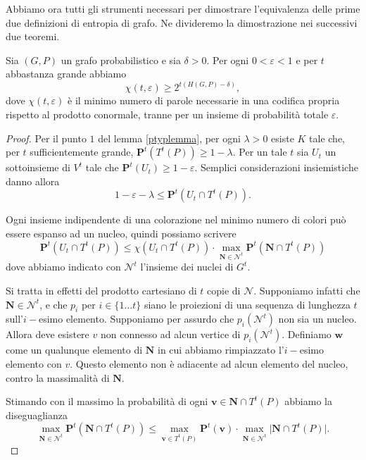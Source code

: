 Abbiamo ora tutti gli strumenti necessari per dimostrare l'equivalenza delle prime due definizioni di entropia di grafo. Ne divideremo la dimostrazione nei successivi due teoremi. 
\begin{theorem}[K\"orner]
	Sia \((G,P)\) un grafo probabilistico e sia \(\delta>0\). Per ogni \(0<\varepsilon<1\) e per \(t\) abbastanza grande abbiamo
	\[\chi(t,\varepsilon)\ge 2^{t(H(G,P)-\delta)},\]
	dove \(\chi(t, \varepsilon)\) è il minimo numero di parole necessarie in una codifica propria rispetto al prodotto conormale, tranne per un insieme di probabilità totale \(\varepsilon\). 
\end{theorem}
\begin{proof}
	Per il punto \(1\) del lemma \ref{ptyplemma}, per ogni \(\lambda>0\) esiste \(K\) tale che, per \(t\) sufficientemente grande, \(\mathbf{P}^t(T^t(P))\ge 1-\lambda\). Per un tale \(t\) sia \(U_{t}\) un sottoinsieme di \(V^t\) tale che \(\mathbf{P}^t(U_{t})\ge 1-\varepsilon\). Semplici considerazioni insiemistiche danno allora 
	\begin{equation}
		\label{eq:epsilonlambda} 1-\varepsilon-\lambda\le \mathbf{P}^t(U_{t}\cap T^t(P)). 
	\end{equation}
	
	Ogni insieme indipendente di una colorazione nel minimo numero di colori può essere espanso ad un nucleo, quindi possiamo scrivere 
	\begin{equation}
		\label{eq:expansion} \mathbf{P}^t(U_{t}\cap T^t(P))\le \chi(U_{t}\cap T^t(P))\cdot\max_{\mathbf{N}\in \mathcal{N}^t} \mathbf{P}^t(\mathbf{N}\cap T^t(P)) 
	\end{equation}
	dove abbiamo indicato con \(\mathcal{N}^t\) l'insieme dei nuclei di \(G^t\).
	
	Si tratta in effetti del prodotto cartesiano di \(t\) copie di \(\mathcal{N}\). Supponiamo infatti che \(\mathbf{N}\in \mathcal{N}^t\), e che \(p_i\) per \(i\in\{1\dots t\}\) siano le proiezioni di una sequenza di lunghezza \(t\) sull'\(i-\)esimo elemento. Supponiamo per assurdo che \(p_i(\mathcal{N}^t)\) non sia un nucleo. Allora deve esistere \(v\) non connesso ad alcun vertice di \(p_i(\mathcal{N}^t)\). Definiamo \(\mathbf{w}\) come un qualunque elemento di \(\mathbf{N}\) in cui abbiamo rimpiazzato l'\(i-\)esimo elemento con \(v\). Questo elemento non è adiacente ad alcun elemento del nucleo, contro la massimalità di \(\mathbf{N}\).
	
	Stimando con il massimo la probabilità di ogni \(\mathbf{v}\in \mathbf{N}\cap T^{t}(P)\) abbiamo la diseguaglianza 
	\begin{equation}
		\label{eq:maxmax} \max_{\mathbf{N}\in \mathcal{N}^t} \mathbf{P}^t(\mathbf{N}\cap T^t(P))\le \max_{\mathbf{v}\in T^{t}(P)} \mathbf{P}^t(\mathbf{v})\cdot \max_{\mathbf{N}\in \mathcal{N}^t} \big\vert \mathbf{N}\cap T^t(P) \big\vert. 
	\end{equation}
	

\end{proof}
